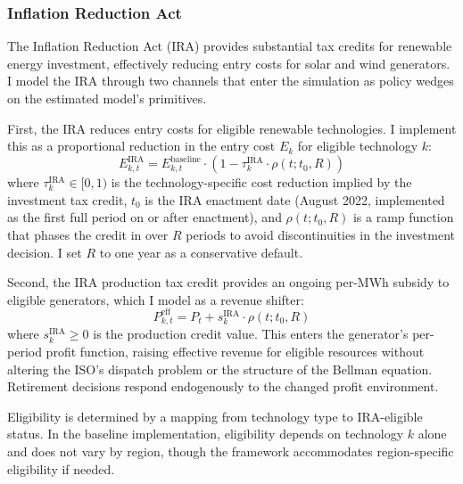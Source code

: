 \documentclass[12pt]{article}
\begin{document}

\subsubsection{Inflation Reduction Act}

The Inflation Reduction Act (IRA) provides substantial tax credits for renewable energy investment, effectively reducing entry costs for solar and wind generators. I model the IRA through two channels that enter the simulation as policy wedges on the estimated model's primitives.

First, the IRA reduces entry costs for eligible renewable technologies. I implement this as a proportional reduction in the entry cost $E_k$ for eligible technology $k$:
\begin{equation}
    E_{k,t}^{\text{IRA}} = E_{k,t}^{\text{baseline}} \cdot (1 - \tau^{\text{IRA}}_k \cdot \rho(t; t_0, R))
\end{equation}
where $\tau^{\text{IRA}}_k \in [0,1)$ is the technology-specific cost reduction implied by the investment tax credit, $t_0$ is the IRA enactment date (August 2022, implemented as the first full period on or after enactment), and $\rho(t; t_0, R)$ is a ramp function that phases the credit in over $R$ periods to avoid discontinuities in the investment decision. I set $R$ to one year as a conservative default.

Second, the IRA production tax credit provides an ongoing per-MWh subsidy to eligible generators, which I model as a revenue shifter:
\begin{equation}
    P_{k,t}^{\text{eff}} = P_t + s^{\text{IRA}}_k \cdot \rho(t; t_0, R)
\end{equation}
where $s^{\text{IRA}}_k \geq 0$ is the production credit value. This enters the generator's per-period profit function, raising effective revenue for eligible resources without altering the ISO's dispatch problem or the structure of the Bellman equation. Retirement decisions respond endogenously to the changed profit environment.

Eligibility is determined by a mapping from technology type to IRA-eligible status. In the baseline implementation, eligibility depends on technology $k$ alone and does not vary by region, though the framework accommodates region-specific eligibility if needed.
\end{document}
